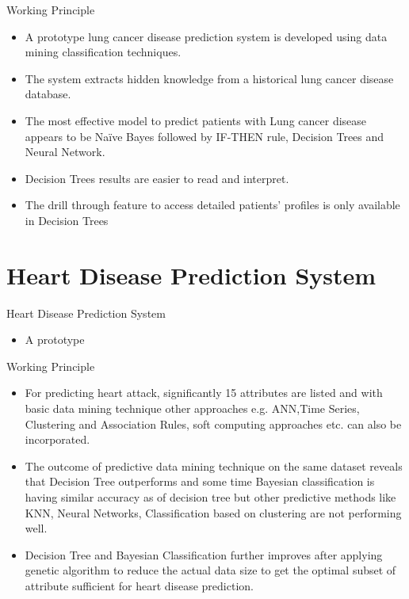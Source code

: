 \documentclass{SKP-beamer}
\begin{document}
\begin{frame}{Working Principle}
	\begin{itemize}
		\item A prototype lung cancer disease prediction system is
		developed using data mining classification techniques. 
		\item The system extracts hidden knowledge from a historical lung
		cancer disease database. 
		\item The most effective model to predict patients with Lung cancer disease appears to be
		Naïve Bayes followed by IF-THEN rule, Decision Trees and Neural Network.
		\item Decision Trees results are easier to read and interpret. 
		\item The drill through feature to access detailed patients’ profiles is only available in Decision Trees	
	\end{itemize}
\end{frame}

\section{\textbf{Heart Disease Prediction System}}

\begin{frame}{Heart Disease Prediction System}
	\begin{itemize}
		\item A prototype
	\end{itemize}
\end{frame}

\begin{frame}{Working Principle}
	\begin{itemize}
		\item For predicting heart attack, significantly 15 attributes are listed
		and with basic data mining technique other approaches e.g. ANN,Time Series, Clustering and Association Rules, soft computing approaches etc. can also be incorporated. 
		\item The outcome of predictive data mining technique on the same dataset reveals that
		Decision Tree outperforms and some time Bayesian classification is having similar accuracy as of decision tree but other predictive methods like KNN, Neural Networks, Classification based on clustering are not performing well.
		\item Decision Tree and Bayesian Classification further improves after applying genetic algorithm to reduce the actual data size to get the optimal subset of attribute sufficient for heart disease prediction.
	\end{itemize}
\end{frame}
\end{document}
